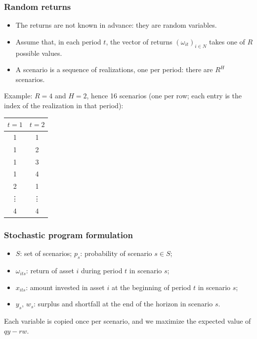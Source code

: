 \documentclass[aspectratio=169]{beamer}
\begin{document}
\begin{frame}
\frametitle{Random returns}

\begin{itemize}
\item
The returns are not known in advance: they are random variables.
\item
Assume that, in each period $t$, the vector of returns $(\omega_{it})_{i \in N}$ takes one of $R$ possible values.
\item
A scenario is a sequence of realizations, one per period: there are $R^H$ scenarios.
\end{itemize}

Example: $R = 4$ and $H = 2$, hence 16 scenarios (one per row; each entry is the index of the realization in that period):
\begin{small}
\begin{center}
\begin{tabular}{cc}
\hline
$t = 1$ & $t = 2$ \\
\hline
1 & 1 \\
1 & 2 \\
1 & 3 \\
1 & 4 \\
2 & 1 \\
\vdots & \vdots \\
4 & 4 \\
\hline
\end{tabular}
\end{center}
\end{small}

\end{frame}

\begin{frame}
\frametitle{Stochastic program formulation}

\begin{itemize}
\item
$S$: set of scenarios; $p_s$: probability of scenario $s \in S$;
\item
$\omega_{its}$: return of asset $i$ during period $t$ in scenario $s$;
\item
$x_{its}$: amount invested in asset $i$ at the beginning of period $t$ in scenario $s$;
\item
$y_s$, $w_s$: surplus and shortfall at the end of the horizon in scenario $s$.
\end{itemize}

\mbox{}

Each variable is copied once per scenario, and we maximize the expected value of $qy - rw$.

\end{frame}
\end{document}
